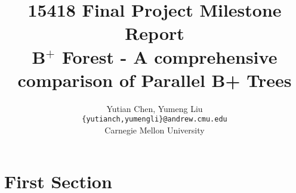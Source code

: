 \documentclass{article}
\title{15418 Final Project Milestone Report\\
B$^+$ Forest - A comprehensive comparison of Parallel B+ Trees}
\author{Yutian Chen, Yumeng Liu\\\texttt{\{yutianch,yumengli\}@andrew.cmu.edu}\\Carnegie Mellon University}
\begin{document}
\pagestyle{empty}
\maketitle
\clearpage

\section{First Section}
\end{document}
